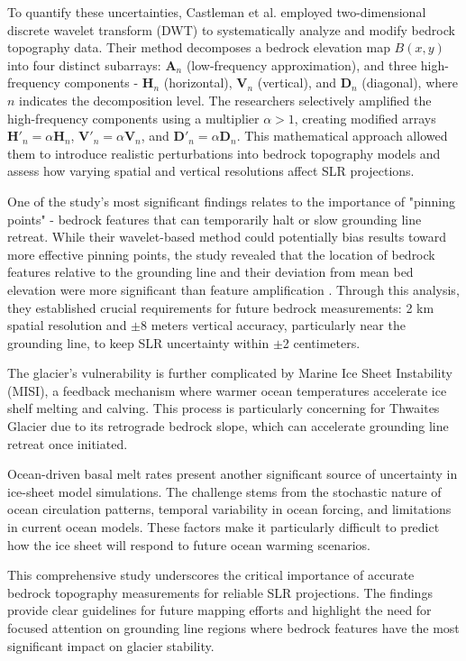 To quantify these uncertainties, Castleman et al. \cite{Castleman_2022} employed two-dimensional discrete wavelet transform (DWT) to systematically analyze and modify bedrock topography data. Their method decomposes a bedrock elevation map $B(x,y)$ into four distinct subarrays: $\mathbf{A}_n$ (low-frequency approximation), and three high-frequency components - $\mathbf{H}_n$ (horizontal), $\mathbf{V}_n$ (vertical), and $\mathbf{D}_n$ (diagonal), where $n$ indicates the decomposition level. The researchers selectively amplified the high-frequency components using a multiplier $\alpha > 1$, creating modified arrays $\mathbf{H}'_n = \alpha\mathbf{H}_n$, $\mathbf{V}'_n = \alpha\mathbf{V}_n$, and $\mathbf{D}'_n = \alpha\mathbf{D}_n$. This mathematical approach allowed them to introduce realistic perturbations into bedrock topography models and assess how varying spatial and vertical resolutions affect SLR projections.

One of the study's most significant findings relates to the importance of "pinning points" - bedrock features that can temporarily halt or slow grounding line retreat. While their wavelet-based method could potentially bias results toward more effective pinning points, the study revealed that the location of bedrock features relative to the grounding line and their deviation from mean bed elevation were more significant than feature amplification \cite{Castleman_2022}. Through this analysis, they established crucial requirements for future bedrock measurements: 2 km spatial resolution and $\pm$8 meters vertical accuracy, particularly near the grounding line, to keep SLR uncertainty within $\pm$2 centimeters.

The glacier's vulnerability is further complicated by Marine Ice Sheet Instability (MISI), a feedback mechanism where warmer ocean temperatures accelerate ice shelf melting and calving. This process is particularly concerning for Thwaites Glacier due to its retrograde bedrock slope, which can accelerate grounding line retreat once initiated.

Ocean-driven basal melt rates present another significant source of uncertainty in ice-sheet model simulations. The challenge stems from the stochastic nature of ocean circulation patterns, temporal variability in ocean forcing, and limitations in current ocean models. These factors make it particularly difficult to predict how the ice sheet will respond to future ocean warming scenarios.

This comprehensive study underscores the critical importance of accurate bedrock topography measurements for reliable SLR projections. The findings provide clear guidelines for future mapping efforts and highlight the need for focused attention on grounding line regions where bedrock features have the most significant impact on glacier stability.


